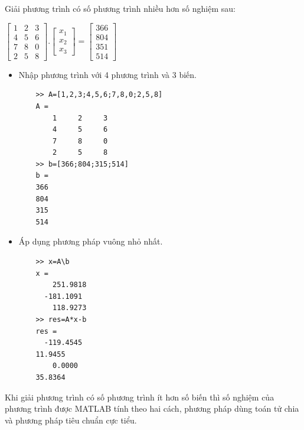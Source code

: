 \documentclass[12pt,a4paper]{article}
\begin{document}
\begin{example}
Giải phương trình có số phương trình nhiều hơn số nghiệm sau:\\
\begin{center}
	$\begin{bmatrix} 1 & 2 & 3 \\ 4 & 5 & 6 \\ 7 & 8 & 0 \\ 2 & 5 & 8 \end{bmatrix}.\begin{bmatrix} { x }_{ 1 } \\ { x }_{ 2 } \\ { x }_{ 3 } \end{bmatrix}=\begin{bmatrix} 366 \\ 804 \\ 351 \\ 514 \end{bmatrix}$
\end{center}
\begin{itemize}
	\item Nhập phương trình với 4 phương trình và 3 biến.
\begin{lstlisting}
	>> A=[1,2,3;4,5,6;7,8,0;2,5,8]
	A =
     	1     2     3
     	4     5     6
     	7     8     0
     	2     5     8
	>> b=[366;804;315;514]
	b =
   	366
   	804
   	315
   	514
\end{lstlisting}
	\item Áp dụng phương pháp vuông nhỏ nhất.
\begin{lstlisting}
	>> x=A\b
	x =
  		251.9818
 	  -181.1091
  		118.9273
	>> res=A*x-b
	res =
 	  -119.4545
   	11.9455
    	0.0000
   	35.8364
\end{lstlisting}
\end{itemize}	
\end{example}
Khi giải phương trình có số phương trình ít hơn số biến thì số nghiệm của phương trình được MATLAB tính theo hai cách, phương pháp dùng toán tử chia và phương pháp tiêu chuẩn cực tiểu.\\
\end{document}
